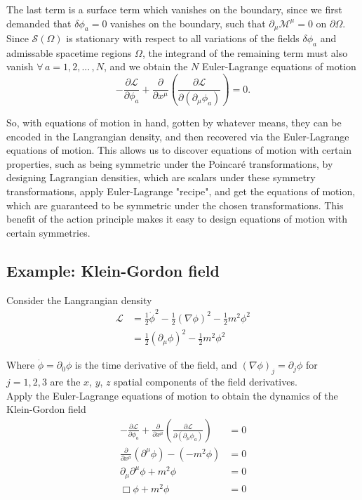 \noindent The last term is a surface term which vanishes on the boundary, since we first demanded that $\delta\phi_a = 0$ vanishes on the boundary, such that $\partial_\mu \mathcal{M}^\mu = 0$ on $\partial\Omega$. \\

\noindent Since $\mathcal{S}(\Omega)$ is stationary with respect to all variations of the fields $\delta\phi_a$ and admissable spacetime regions $\Omega$, the integrand of the remaining term must also vanish $\forall \, a = 1, 2,... \, , N$, and we obtain the $N$ Euler-Lagrange equations of motion
\begin{equation}
-\frac{\partial \mathscr{L}}{\partial \phi_a} + \frac{\partial}{\partial x^\mu} \left( \frac{\partial \mathscr{L}}{\partial (\partial_\mu \phi_a)} \right) = 0.
\end{equation}

\noindent So, with equations of motion in hand, gotten by whatever means, they can be encoded in the Langrangian density, and then recovered via the Euler-Lagrange equations of motion. This allows us to discover equations of motion with certain properties, such as being symmetric under the Poincar\'e transformations, by designing Lagrangian densities, which are scalars under these symmetry transformations, apply Euler-Lagrange "recipe", and get the equations of motion, which are guaranteed to be symmetric under the chosen transformations. This benefit of the action principle makes it easy to design equations of motion with certain symmetries. \\

\subsection*{Example: Klein-Gordon field}

Consider the Langrangian density 
\begin{align}
\mathscr{L} &= \frac{1}{2}\dot{\phi}^2 - \frac{1}{2}(\nabla\phi)^2 - \frac{1}{2}m^2\phi^2 \\
&= \frac{1}{2}(\partial_\mu \phi)^2 - \frac{1}{2}m^2\phi^2
\end{align}

\noindent Where $\dot{\phi} = \partial_0 \phi$ is the time derivative of the field, and $(\nabla\phi)_j = \partial_j\phi$ for $j=1, 2, 3$ are the $x$, $y$, $z$ spatial components of the field derivatives. \\

\noindent Apply the Euler-Lagrange equations of motion to obtain the dynamics of the Klein-Gordon field
\begin{align}
-\frac{\partial \mathscr{L}}{\partial \phi_a} + \frac{\partial}{\partial x^\mu} \left( \frac{\partial \mathscr{L}}{\partial (\partial_\mu \phi_a)} \right) &= 0 \\
\frac{\partial}{\partial x^\mu}(\partial^\mu \phi) -(-m^2 \phi) &= 0 \\
\partial_\mu \partial^\mu \phi + m^2 \phi &=0 \\
\Box \phi + m^2 \phi &= 0
\end{align}


